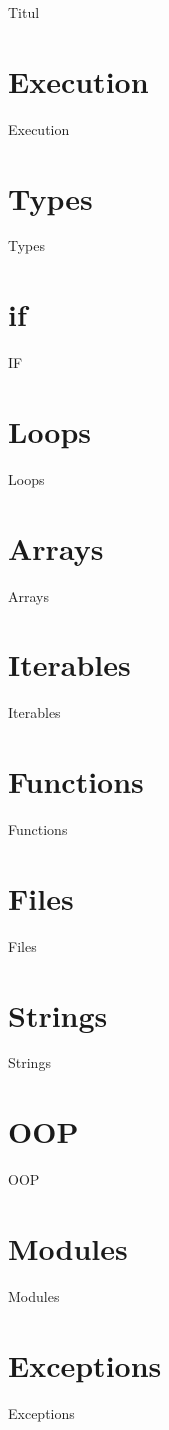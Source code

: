 \documentclass[a4paper,12pt]{book} %
\begin{document}
    {Titul}
    \tableofcontents

    \chapter{Execution}
    {Execution}

    \chapter{Types}
    {Types}

    \chapter{if}
    {IF}

    \chapter{Loops}
    {Loops}

    \chapter{Arrays}
    {Arrays}

    \chapter{Iterables}
    {Iterables}

    \chapter{Functions}
    {Functions}

    \chapter{Files}
    {Files}

    \chapter{Strings}
    {Strings}

    \chapter{OOP}
    {OOP}

    \chapter{Modules}
    {Modules}

    \chapter{Exceptions}
    {Exceptions}
\end{document}
